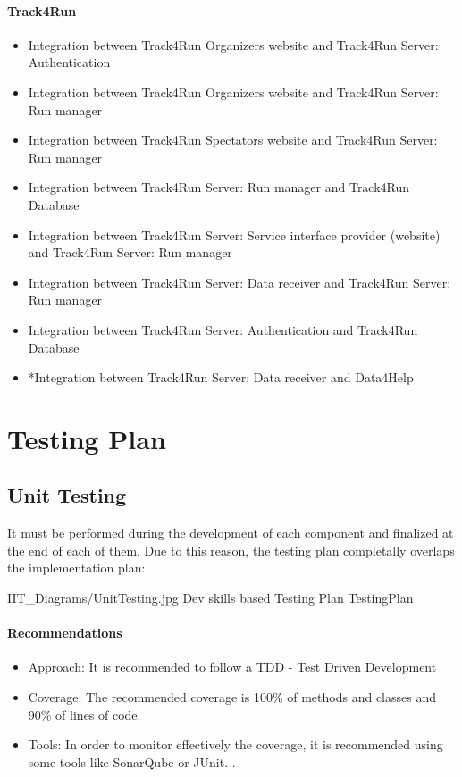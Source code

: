 \documentclass[../DD.tex]{subfiles}
\begin{document}
		\paragraph{Track4Run}
		\begin{itemize}
			\item{Integration between Track4Run Organizers website and Track4Run Server: Authentication}
			\item{Integration between Track4Run Organizers website and Track4Run Server: Run manager}
			\item{Integration between Track4Run Spectators website and Track4Run Server: Run manager}
			\item{Integration between Track4Run Server: Run manager and Track4Run Database}
			\item{Integration between Track4Run Server: Service interface provider (website) and Track4Run Server: Run manager}
			\item{Integration between Track4Run Server: Data receiver and Track4Run Server: Run manager}
			\item{Integration between Track4Run Server: Authentication and Track4Run Database}
			\item{*Integration between Track4Run Server: Data receiver and Data4Help}
		\end{itemize}

	\section{Testing Plan}
		\subsection{Unit Testing}
		It must be performed during the development of each component and finalized at the end of each of them. Due to this reason, the testing plan completally overlaps the implementation plan:

		\image {13cm} {IIT_Diagrams/UnitTesting.jpg} {Dev skills based Testing Plan} {TestingPlan}
		
		\paragraph{Recommendations}
		\begin{itemize}
			\item Approach: It is recommended to follow a TDD - Test Driven Development 
			\item Coverage: The recommended coverage is 100\% of methods and classes and 90\% of lines of code.
			\item Tools: In order to monitor effectively the coverage, it is recommended using some tools like SonarQube or JUnit. .
		\end{itemize} 
		
\end{document}
